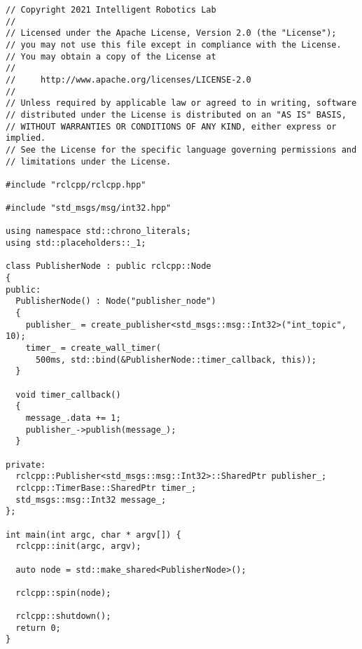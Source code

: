  \footnotesize
\begin{tcolorbox}[sharp corners, colframe=gray!80, colback=LightGray, left=0pt, top=0pt, bottom=0pt, title=\texttt{br2\_basics/src/publisher\_class.cpp}]
  \begin{verbatim}
// Copyright 2021 Intelligent Robotics Lab
//
// Licensed under the Apache License, Version 2.0 (the "License");
// you may not use this file except in compliance with the License.
// You may obtain a copy of the License at
//
//     http://www.apache.org/licenses/LICENSE-2.0
//
// Unless required by applicable law or agreed to in writing, software
// distributed under the License is distributed on an "AS IS" BASIS,
// WITHOUT WARRANTIES OR CONDITIONS OF ANY KIND, either express or implied.
// See the License for the specific language governing permissions and
// limitations under the License.

#include "rclcpp/rclcpp.hpp"

#include "std_msgs/msg/int32.hpp"

using namespace std::chrono_literals;
using std::placeholders::_1;

class PublisherNode : public rclcpp::Node
{
public:
  PublisherNode() : Node("publisher_node")
  {
    publisher_ = create_publisher<std_msgs::msg::Int32>("int_topic", 10);
    timer_ = create_wall_timer(
      500ms, std::bind(&PublisherNode::timer_callback, this));
  }

  void timer_callback()
  {
    message_.data += 1;
    publisher_->publish(message_);
  }

private:
  rclcpp::Publisher<std_msgs::msg::Int32>::SharedPtr publisher_;
  rclcpp::TimerBase::SharedPtr timer_;
  std_msgs::msg::Int32 message_;
};

int main(int argc, char * argv[]) {
  rclcpp::init(argc, argv);

  auto node = std::make_shared<PublisherNode>();

  rclcpp::spin(node);

  rclcpp::shutdown();
  return 0;
}    \end{verbatim}
    \end{tcolorbox}
  \normalsize

